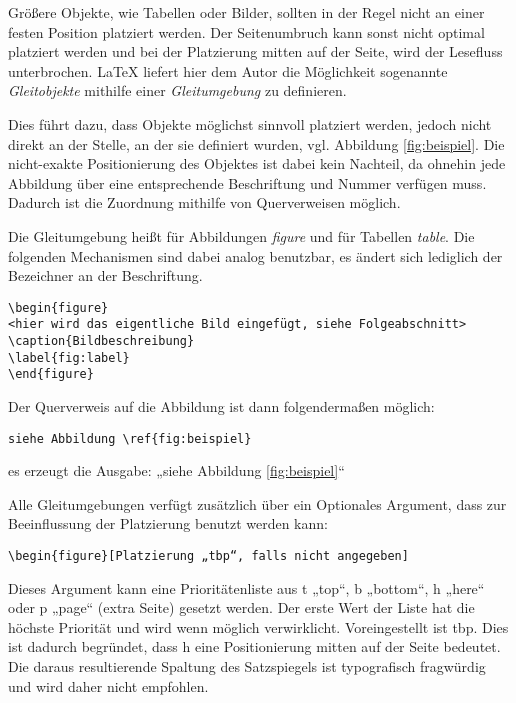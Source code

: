 Größere Objekte, wie Tabellen oder Bilder, sollten in der Regel nicht an einer festen Position platziert werden.
Der Seitenumbruch kann sonst nicht optimal platziert werden und bei der Platzierung mitten auf der Seite, wird der Lesefluss unterbrochen.
\LaTeX{} liefert hier dem Autor die Möglichkeit sogenannte \emph{Gleitobjekte} mithilfe einer \emph{Gleitumgebung} zu definieren.

Dies führt dazu, dass Objekte möglichst sinnvoll platziert werden, jedoch nicht direkt an der Stelle, an der sie definiert wurden, vgl. Abbildung \ref{fig:beispiel}.
Die nicht-exakte Positionierung des Objektes ist dabei kein Nachteil, da ohnehin jede Abbildung über eine entsprechende Beschriftung und Nummer verfügen muss.
Dadurch ist die Zuordnung mithilfe von Querverweisen möglich.

Die Gleitumgebung heißt für Abbildungen \emph{figure} und für Tabellen \emph{table}. Die folgenden Mechanismen sind dabei analog benutzbar, es ändert sich lediglich der Bezeichner an der Beschriftung.

\begin{verbatim}
\begin{figure}
<hier wird das eigentliche Bild eingefügt, siehe Folgeabschnitt>
\caption{Bildbeschreibung}
\label{fig:label}
\end{figure}
\end{verbatim}


Der Querverweis auf die Abbildung ist dann folgendermaßen möglich:
\begin{verbatim}
siehe Abbildung \ref{fig:beispiel}
\end{verbatim}
es erzeugt die Ausgabe: „siehe Abbildung \ref{fig:beispiel}“

Alle Gleitumgebungen verfügt zusätzlich über ein Optionales Argument, dass zur Beeinflussung der Platzierung benutzt werden kann:
\begin{verbatim}
\begin{figure}[Platzierung „tbp“, falls nicht angegeben]
\end{verbatim}

Dieses Argument kann eine Prioritätenliste aus t „top“, b „bottom“, h „here“ oder p „page“ (extra
Seite) gesetzt werden. Der erste Wert der Liste hat die höchste Priorität und wird wenn möglich verwirklicht.
Voreingestellt ist tbp. Dies ist dadurch begründet, dass h eine Positionierung mitten auf der Seite
bedeutet. Die daraus resultierende Spaltung des Satzspiegels ist typografisch fragwürdig und wird daher nicht empfohlen.


